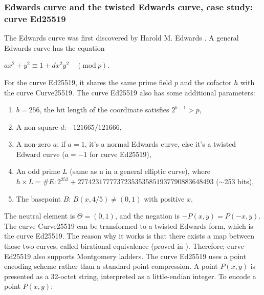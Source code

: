\subsubsection{Edwards curve and the twisted Edwards curve, case study: curve Ed25519}
The Edwards curve was first discovered by Harold M. Edwards \cite{Edwards-2007}. A general Edwards curve has the equation

\begin{center}
  $ax^2 + y^2 \equiv 1 + dx^2 y^2 \quad (\text{mod} \ p)$.
\end{center}

For the curve Ed25519, it shares the same prime field $p$ and the cofactor $h$ with the curve Curve25519. The curve Ed25519 also has some additional parameters:

\begin{enumerate}
  \item $b = 256$, the bit length of the coordinate satisfies $2^{b-1} > p$,
  \item A non-square $d: -121665/121666$,
  \item A non-zero $a$: if $a = 1$, it's a normal Edwards curve, else it's a twisted Edward curve ($a = -1$ for curve Ed25519),
  \item An odd prime $L$ (same as n in a general elliptic curve), where $h \times L = \#E: 2^{252}+27742317777372353535851937790883648493$ ($\sim$253 bits),
  \item The basepoint $B$: $B(x, 4/5) \neq (0, 1)$ with positive $x$.
\end{enumerate}

The neutral element is $\Theta = (0,1)$, and the negation is $-P(x, y) = P(-x, y)$. The curve Curve25519 can be transformed to a twisted Edwards form, which is the curve Ed25519. The reason why it works is that there exists a map between those two curves, called birational equivalence (proved in \cite{Bernstein2011}). Therefore; curve Ed25519 also supports Montgomery ladders. The curve Ed25519 uses a point encoding scheme rather than a standard point compression. A point $P(x, y)$ is presented as a 32-octet string, interpreted as a little-endian integer. To encode a point $P(x, y)$:

